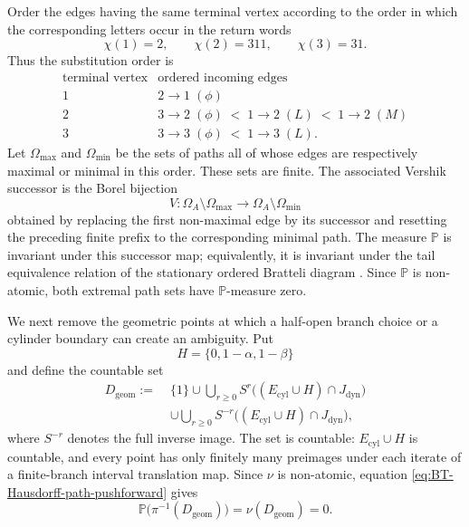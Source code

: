\documentclass[11pt]{amsart}
\theoremstyle{plain}
\theoremstyle{definition}
\theoremstyle{remark}
\begin{document}
Order the edges having the same terminal vertex according to the order
in which the corresponding letters occur in the return words
\[
        \chi(1)=2,
        \qquad
        \chi(2)=311,
        \qquad
        \chi(3)=31.
\]
Thus the substitution order is
\[
\begin{array}{c|c}
\text{terminal vertex}&\text{ordered incoming edges}\\
\hline
1&2\longrightarrow1\;(\phi)\\
2&3\longrightarrow2\;(\phi)
  \;<\;
  1\longrightarrow2\;(L)
  \;<\;
  1\longrightarrow2\;(M)\\
3&3\longrightarrow3\;(\phi)
  \;<\;
  1\longrightarrow3\;(L).
\end{array}
\tag{B.9}
\label{eq:BT-substitution-edge-order}
\]
Let \(\Omega_{\max}\) and \(\Omega_{\min}\) be the sets of paths all of
whose edges are respectively maximal or minimal in this order. These
sets are finite. The associated Vershik successor is the Borel
bijection
\[
        V:
        \Omega_A\setminus\Omega_{\max}
        \longrightarrow
        \Omega_A\setminus\Omega_{\min}
\]
obtained by replacing the first non-maximal edge by its successor and
resetting the preceding finite prefix to the corresponding minimal
path. The measure \(\mathbb P\) is invariant under this successor map;
equivalently, it is invariant under the tail equivalence relation of
the stationary ordered Bratteli diagram
\cite[Theorem~3.8 and Remark~3.9]{BezuglyiKwiatkowskiMedynetsSolomyak2010}.
Since \(\mathbb P\) is non-atomic, both extremal path sets have
\(\mathbb P\)-measure zero.

We next remove the geometric points at which a half-open branch choice
or a cylinder boundary can create an ambiguity. Put
\[
        H=\{0,1-\alpha,1-\beta\}
\]
and define the countable set
\[
\begin{aligned}
        D_{\mathrm{geom}}
        :=\;&\{1\}
        \cup
        \bigcup_{r\geq0}
        S^r\bigl((E_{\mathrm{cyl}}\cup H)\cap J_{\mathrm{dyn}}\bigr)\\
        &\cup
        \bigcup_{r\geq0}
        S^{-r}\bigl((E_{\mathrm{cyl}}\cup H)\cap J_{\mathrm{dyn}}\bigr),
\end{aligned}
\tag{B.10}
\label{eq:BT-geometric-exceptional-set}
\]
where \(S^{-r}\) denotes the full inverse image. The set is countable:
\(E_{\mathrm{cyl}}\cup H\) is countable, and every point has only
finitely many preimages under each iterate of a finite-branch interval
translation map. Since \(\nu\) is non-atomic, equation
\eqref{eq:BT-Hausdorff-path-pushforward} gives
\[
        \mathbb P\bigl(\pi^{-1}(D_{\mathrm{geom}})\bigr)
        =
        \nu(D_{\mathrm{geom}})
        =0.
\tag{B.11}
\label{eq:BT-geometric-exceptional-null}
\]
\end{document}
